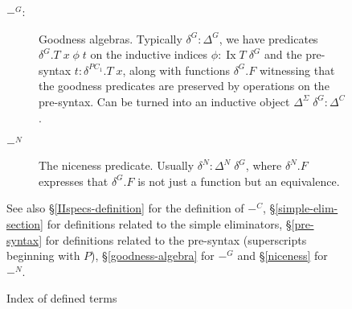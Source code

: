 \documentclass[runningheads]{llncs}
\DeclareMathOperator{\Ix}{Ix}
\begin{document}
{\begin{figure}[htpb]
\begin{description}
        \item[$-^G$:] Goodness algebras. Typically $\delta^G : \Delta^G$, we have predicates $\delta^G.T\;x\;\phi\;t$ on the inductive indices $\phi : \Ix T\;\delta^G$ and the pre-syntax $t : \delta^{PC_1}.T\;x$, along with functions $\delta^G.F$ witnessing that the goodness predicates are preserved by operations on the pre-syntax. Can be turned into an inductive object $\Delta^\Sigma\;\delta^G : \Delta^C$.
        \item[$-^N$] The niceness predicate. Usually $\delta^N : \Delta^N\;\delta^G$, where $\delta^N.F$ expresses that $\delta^G.F$ is not just a function but an equivalence.
    \end{description}

    See also \S\ref{IIspecs-definition} for the definition of $-^C$, \S\ref{simple-elim-section} for definitions related to the simple eliminators, \S\ref{pre-syntax} for definitions related to the pre-syntax (superscripts beginning with $P$), \S\ref{goodness-algebra} for $-^G$ and \S\ref{niceness} for $-^N$.
    
    \caption{\label{translation-index}Index of defined terms}
\end{figure}

}
\end{document}
